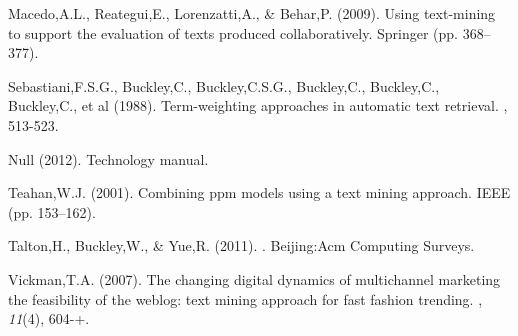 \begin{thebibliography}{}
Macedo,A.L., Reategui,E., Lorenzatti,A., \& Behar,P. (2009).
\newblock Using text-mining to support the evaluation of texts produced collaboratively. Springer (pp. 368--377).

Sebastiani,F.S.G., Buckley,C., Buckley,C.S.G., Buckley,C., Buckley,C., Buckley,C., et al (1988).
\newblock Term-weighting approaches in automatic text retrieval.
, 513-523.

Null (2012).
\newblock Technology manual.

Teahan,W.J. (2001).
\newblock Combining ppm models using a text mining approach. IEEE (pp. 153--162).

Talton,H., Buckley,W., \& Yue,R. (2011).
. Beijing:Acm Computing Surveys.

Vickman,T.A. (2007).
\newblock The changing digital dynamics of multichannel marketing the feasibility of the weblog: text mining approach for fast fashion trending.
, {\em 11}(4), 604-+.

\end{thebibliography}
    